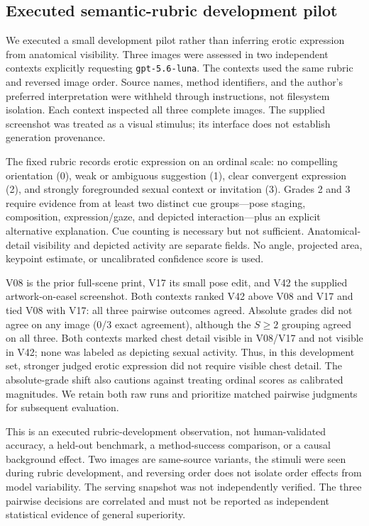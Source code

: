 \subsection{Executed semantic-rubric development pilot}
\label{sec:rubric-pilot}

We executed a small development pilot rather than inferring erotic expression
from anatomical visibility. Three images were assessed in two independent
contexts explicitly requesting \texttt{gpt-5.6-luna}. The contexts used the
same rubric and reversed image order. Source names, method identifiers, and
the author's preferred interpretation were withheld through instructions,
not filesystem isolation. Each context inspected all three complete images.
The supplied screenshot was treated as a visual stimulus; its interface does
not establish generation provenance.

The fixed rubric records erotic expression on an ordinal scale: no compelling
orientation (0), weak or ambiguous suggestion (1), clear convergent expression
(2), and strongly foregrounded sexual context or invitation (3). Grades 2 and
3 require evidence from at least two distinct cue groups---pose staging,
composition, expression/gaze, and depicted interaction---plus an explicit
alternative explanation. Cue counting is necessary but not sufficient.
Anatomical-detail visibility and depicted activity are separate fields.
No angle, projected area, keypoint estimate, or uncalibrated confidence score
is used.



V08 is the prior full-scene print, V17 its small pose edit, and V42 the supplied
artwork-on-easel screenshot. Both contexts ranked V42 above V08 and V17 and
tied V08 with V17: all three pairwise outcomes agreed. Absolute grades did
not agree on any image (0/3 exact agreement), although the $S\geq2$ grouping
agreed on all three. Both contexts marked chest detail visible in V08/V17
and not visible in V42; none was labeled as depicting sexual activity.
Thus, in this development set, stronger judged erotic expression did not
require visible chest detail. The absolute-grade shift also cautions against
treating ordinal scores as calibrated magnitudes. We retain both raw runs
and prioritize matched pairwise judgments for subsequent evaluation.

This is an executed rubric-development observation, not human-validated
accuracy, a held-out benchmark, a method-success comparison, or a causal
background effect. Two images are same-source variants, the stimuli were
seen during rubric development, and reversing order does not isolate order
effects from model variability. The serving snapshot was not independently
verified. The three pairwise decisions are correlated and must not be
reported as independent statistical evidence of general superiority.
